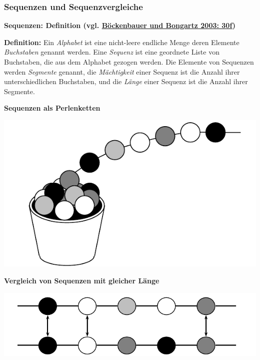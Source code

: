 \subsubsection{\texorpdfstring{{Sequenzen und
Sequenzvergleiche}}{Sequenzen und Sequenzvergleiche}}

\par\noindent\textbf{Sequenzen: Definition (vgl.
\href{http://bibliography.lingpy.org?key=Boeckenbauer2003}{Böckenbauer
und Bongartz 2003: 30f})}

\par\noindent\textbf{Definition:} Ein \emph{Alphabet} ist eine nicht-leere endliche
Menge deren Elemente \emph{Buchstaben} genannt werden. Eine
\emph{Sequenz} ist eine geordnete Liste von Buchstaben, die aus dem
Alphabet gezogen werden. Die Elemente von Sequenzen werden
\emph{Segmente} genannt, die \emph{Mächtigkeit} einer Sequenz ist die
Anzahl ihrer unterschiedlichen Buchstaben, und die \emph{Länge} einer
Sequenz ist die Anzahl ihrer Segmente.



\par\noindent\textbf{Sequenzen als Perlenketten}

\includegraphics[width=\textwidth]{img/kette.pdf}


\par\noindent\textbf{Vergleich von Sequenzen mit gleicher Länge}

\includegraphics[width=\textwidth]{img/hamming.pdf}



